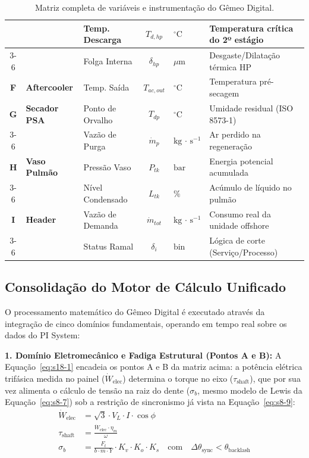 \documentclass[12pt,a4paper]{article}
\numberwithin{equation}{section}
\numberwithin{table}{section}
\numberwithin{figure}{section}
\begin{document}
\begin{table}[h!]
{\begin{tabular}{|c|l|l|c|l|l|}
			& & Temp. Descarga & $T_{d,hp}$ & $^{\circ}\text{C}$ & Temperatura crítica do 2º estágio \\ \cline{3-6} 
			& & Folga Interna & $\delta_{hp}$ & $\mu\text{m}$ & Desgaste/Dilatação térmica HP \\ \hline
			\textbf{F} & \textbf{Aftercooler} & Temp. Saída & $T_{ac,out}$ & $^{\circ}\text{C}$ & Temperatura pré-secagem \\ \hline
			\textbf{G} & \textbf{Secador PSA} & Ponto de Orvalho & $T_{dp}$ & $^{\circ}\text{C}$ & Umidade residual (ISO 8573-1) \\ \cline{3-6} 
			& & Vazão de Purga & $\dot{m}_{p}$ & $\text{kg}\,\cdotp\,\text{s}^{-1}$ & Ar perdido na regeneração \\ \hline
			\textbf{H} & \textbf{Vaso Pulmão} & Pressão Vaso & $P_{tk}$ & $\text{bar}$ & Energia potencial acumulada \\ \cline{3-6} 
			& & Nível Condensado & $L_{tk}$ & $\%$ & Acúmulo de líquido no pulmão \\ \hline
			\textbf{I} & \textbf{Header} & Vazão de Demanda & $\dot{m}_{tot}$ & $\text{kg}\,\cdotp\,\text{s}^{-1}$ & Consumo real da unidade offshore \\ \cline{3-6} 
			& & Status Ramal & $\delta_{i}$ & $\text{bin}$ & Lógica de corte (Serviço/Processo) \\ \hline
		\end{tabular}
	}
	\caption{Matriz completa de variáveis e instrumentação do Gêmeo Digital.}
\end{table}

\subsection{Consolidação do Motor de Cálculo Unificado}

O processamento matemático do Gêmeo Digital é executado através da integração de cinco domínios fundamentais, operando em tempo real sobre os dados do PI System:

\textbf{1. Domínio Eletromecânico e Fadiga Estrutural (Pontos A e B):} A Equação~\eqref{eq:s18-1} encadeia os pontos A e B da matriz acima: a potência elétrica trifásica medida no painel ($\dot{W}_{\text{elec}}$) determina o torque no eixo ($\tau_{\text{shaft}}$), que por sua vez alimenta o cálculo de tensão na raiz do dente ($\sigma_b$, mesmo modelo de Lewis da Equação~\eqref{eq:s8-7}) sob a restrição de sincronismo já vista na Equação~\eqref{eq:s8-9}:
\begin{equation}\label{eq:s18-1}
\begin{aligned}
	\dot{W}_{\text{elec}} &= \sqrt{3} \cdotp V_L \cdotp I \cdotp \cos \phi \\[8pt]
	\tau_{\text{shaft}} &= \frac{\dot{W}_{\text{elec}} \cdotp \eta_m}{\omega} \\[8pt]
	\sigma_b &= \frac{F_t}{b \cdotp m \cdotp Y} \cdotp K_v \cdotp K_o \cdotp K_s \quad \text{com} \quad \Delta \theta_{\text{sync}} < \theta_{\text{backlash}}
\end{aligned}
\end{equation}
\end{document}
